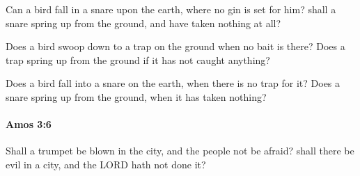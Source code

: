 			\begin{versebox}
					\item[BHS] 
					\item[LXX] 
					\item[ASV] Can a bird fall in a snare upon the earth, where no gin is set for him? shall a snare spring up from the ground, and have taken nothing at all?
					\item[NIV] Does a bird swoop down to a trap on the ground when no bait is there? Does a trap spring up from the ground if it has not caught anything?
					\item[NRSV] Does a bird fall into a snare on the earth, when there is no trap for it? Does a snare spring up from the ground, when it has taken nothing?
			\end{versebox}

		\paragraph{Amos 3:6} %
			\label{AMOS-3-6}

			Shall a trumpet be blown in the city, and the people not be afraid? shall there be evil in a city, and the LORD hath not done it?


